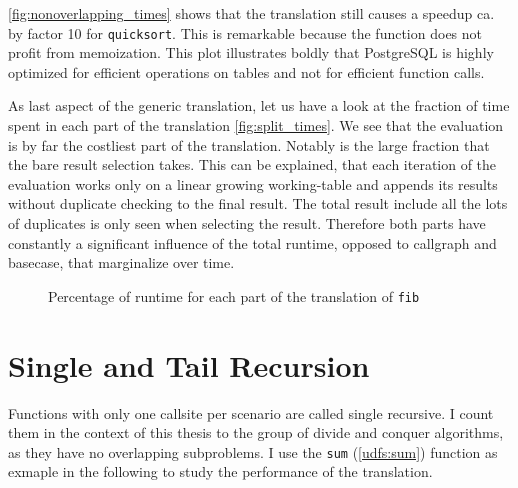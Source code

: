 \autoref{fig:nonoverlapping_times} shows that the translation still causes a speedup ca. by factor 10 for \texttt{quicksort}. This is remarkable because the function does not profit from memoization. This plot illustrates boldly that PostgreSQL is highly optimized for efficient operations on tables and not for efficient function calls.

As last aspect of the generic translation, let us have a look at the fraction of time spent in each part of the translation \autoref{fig:split_times}. We see that the evaluation is by far the costliest part of the translation. Notably is the large fraction that the bare result selection takes. This can be explained, that each iteration of the evaluation works only on a linear growing working-table and appends its results without duplicate checking to the final result. The total result include all the lots of duplicates is only seen when selecting the result. Therefore both parts have constantly a significant influence of the total runtime, opposed to callgraph and basecase, that marginalize over time.

\begin{figure}[h!]
    \centering
    
    \caption{Percentage of runtime for each part of the translation of \texttt{fib}}
    \label{fig:split_times}
\end{figure}


\iffalse
\begin{figure}[h]
    \centering
    
    \caption{Impact of the number of scenarios on the runtime. Single recursive function with expensive predicates}
    \label{fig:recn_times}
\end{figure}

Impact of number of scenarios (Overhead by predicates) \autoref{fig:recn_times}

\fi




\section{Single and Tail Recursion}

Functions with only one callsite per scenario are called single recursive. I count them in the context of this thesis to the group of divide and conquer algorithms, as they have no overlapping subproblems. I use the \texttt{sum} (\autoref{udfs:sum}) function as exmaple in the following to study the performance of the translation.

